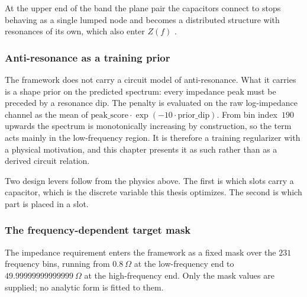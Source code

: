 At the upper end of the band the plane pair the capacitors connect to stops
behaving as a single lumped node and becomes a distributed structure with
resonances of its own, which also enter $Z(f)$
\cite{novak2007frequency}.

\subsubsection*{Anti-resonance as a training prior}

The framework does not carry a circuit model of anti-resonance. What it carries
is a shape prior on the predicted spectrum: every impedance peak must be
preceded by a resonance dip. The penalty is evaluated on the raw log-impedance
channel as the mean of
$\text{peak\_score} \cdot \exp(-10 \cdot \text{prior\_dip})$. From bin
index~$190$ upwards the spectrum is monotonically increasing by construction, so
the term acts mainly in the low-frequency region. It is therefore a training
regularizer with a physical motivation, and this chapter presents it as such
rather than as a derived circuit relation.

Two design levers follow from the physics above. The first is which slots carry a
capacitor, which is the discrete variable this thesis optimizes. The second is
which part is placed in a slot. 

\subsubsection*{The frequency-dependent target mask}

The impedance requirement enters the framework as a fixed mask over the $231$
frequency bins, running from $0.8~\Omega$ at the low-frequency end to
$49.99999999999999~\Omega$ at the high-frequency end. Only the mask values are
supplied; no analytic form is fitted to them.

